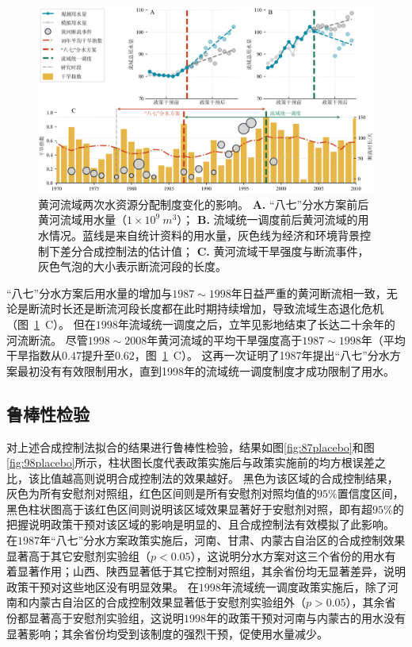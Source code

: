 \begin{figure}[!h]
	\centering
	\includegraphics[width=\linewidth]{img/ch5/ch5_results.png}
	\caption[黄河流域两次水资源分配制度变化的影响]{
        黄河流域两次水资源分配制度变化的影响。
        \textbf{A.} “八七”分水方案前后黄河流域用水量（$1 \times 10^9~m^3$）；
        \textbf{B.} 流域统一调度前后黄河流域的用水情况。蓝线是来自统计资料的用水量，灰色线为经济和环境背景控制下差分合成控制法的估计值；
        \textbf{C.} 黄河流域干旱强度与断流事件，灰色气泡的大小表示断流河段的长度。
	}\label{ch5:fig:main_results}
\end{figure}

“八七”分水方案后用水量的增加与$1987 \sim 1998$年日益严重的黄河断流相一致，无论是断流时长还是断流河段长度都在此时期持续增加，导致流域生态退化危机（图~\ref{ch5:fig:main_results}~C）。
但在$1998$年流域统一调度之后，立竿见影地结束了长达二十余年的河流断流。
尽管$1998 \sim 2008$年黄河流域的平均干旱强度高于$1987 \sim 1998$年（平均干旱指数从$0.47$提升至$0.62$，图~\ref{ch5:fig:main_results}~C）。
这再一次证明了1987年提出“八七”分水方案最初没有有效限制用水，直到1998年的流域统一调度制度才成功限制了用水。

\subsection{鲁棒性检验}

对上述合成控制法拟合的结果进行鲁棒性检验，结果如图\ref{fig:87placebo}和图\ref{fig:98placebo}所示，柱状图长度代表政策实施后与政策实施前的均方根误差之比，该比值越高则说明合成控制法的效果越好。
黑色为该区域的合成控制结果，灰色为所有安慰剂对照组，红色区间则是所有安慰剂对照均值的$95\%$置信度区间，黑色柱状图高于该红色区间则说明该区域效果显著好于安慰剂对照，即有超$95\%$的把握说明政策干预对该区域的影响是明显的、且合成控制法有效模拟了此影响。
在$1987$年“八七”分水方案政策实施后，河南、甘肃、内蒙古自治区的合成控制效果显著高于其它安慰剂实验组（$p < 0.05$），这说明分水方案对这三个省份的用水有着显著作用；山西、陕西显著低于其它控制对照组，其余省份均无显著差异，说明政策干预对这些地区没有明显效果。
在$1998$年流域统一调度政策实施后，除了河南和内蒙古自治区的合成控制效果显著低于安慰剂实验组外（$p > 0.05$），其余省份都显著高于安慰剂实验组，这说明$1998$年的政策干预对河南与内蒙古的用水没有显著影响；其余省份均受到该制度的强烈干预，促使用水量减少。

